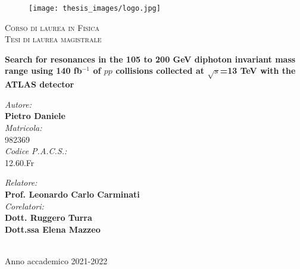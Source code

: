 \documentclass[a4paper, oneside, 11pt, openright]{book}
\begin{document}
	\begin{titlepage}
		\begin{figure}
			\texttt{[image: thesis\_images/logo.jpg]}
		\end{figure}
		\begin{center}
			\textsc{\large Corso di laurea in Fisica}\\[0.2cm]
			\textsc{\normalsize Tesi di laurea magistrale}\\[2cm]
			
			\begin{doublespace}
				\textbf{\LARGE Search for resonances in the 105 to 200 GeV diphoton invariant mass range using 140 fb$^{-1}$ of $pp$ collisions collected at $\sqrt{s}$=13 TeV with the ATLAS detector}
				\\[2cm]
			\end{doublespace}
			
			\begin{minipage}{0.4\textwidth}
				\begin{flushleft}
					\emph{Autore:} \\[0mm]
					\textbf{Pietro Daniele} \\[4mm]
					\emph{Matricola:}\\
					982369 \\[4mm]
					\emph{Codice P.A.C.S.:}\\[0mm]
					12.60.Fr
				\end{flushleft}
			\end{minipage}
			\begin{minipage}{0.4\textwidth}
				\begin{flushright} 
					\emph{Relatore:} \\
					\textbf{Prof. Leonardo Carlo Carminati} \\[1.2em]
					\emph{Corelatori:} \\
					\textbf{Dott. Ruggero Turra} \\
					\textbf{Dott.ssa Elena Mazzeo} \\[1.2em]
				\end{flushright}
			\end{minipage}\\[2cm]
			\vfill
			Anno accademico 2021-2022
		\end{center}
		
		
	\end{titlepage}
	
\end{document}
